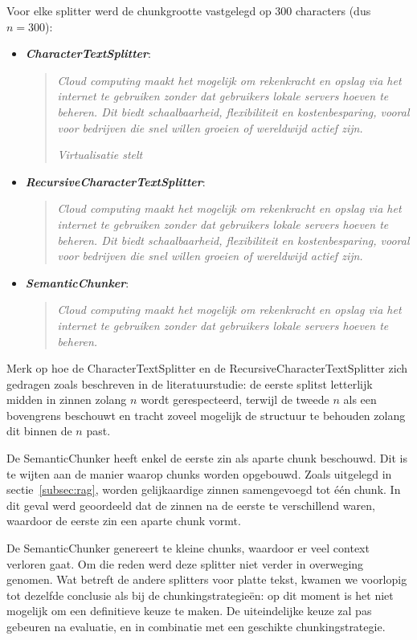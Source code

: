 Voor elke splitter werd de chunkgrootte vastgelegd op 300 characters (dus $n = 300$):

\begin{itemize}
    \item \textbf{\emph{CharacterTextSplitter}}: \begin{quote}
        \emph{Cloud computing maakt het mogelijk om rekenkracht en opslag via het internet te gebruiken zonder dat gebruikers lokale servers hoeven te beheren. Dit biedt schaalbaarheid, flexibiliteit en kostenbesparing, vooral voor bedrijven die snel willen groeien of wereldwijd actief zijn.}
        
        \emph{Virtualisatie stelt}
    \end{quote}
    \item \textbf{\emph{RecursiveCharacterTextSplitter}}: \begin{quote}
        \emph{Cloud computing maakt het mogelijk om rekenkracht en opslag via het internet te gebruiken zonder dat gebruikers lokale servers hoeven te beheren. Dit biedt schaalbaarheid, flexibiliteit en kostenbesparing, vooral voor bedrijven die snel willen groeien of wereldwijd actief zijn.}
    \end{quote}
    \item \textbf{\emph{SemanticChunker}}:  \begin{quote}
        \emph{Cloud computing maakt het mogelijk om rekenkracht en opslag via het internet te gebruiken zonder dat gebruikers lokale servers hoeven te beheren.}
    \end{quote}
\end{itemize}

Merk op hoe de CharacterTextSplitter en de RecursiveCharacterTextSplitter zich gedragen zoals beschreven in de literatuurstudie: de eerste splitst letterlijk midden in zinnen zolang $n$ wordt gerespecteerd, terwijl de tweede $n$ als een bovengrens beschouwt en tracht zoveel mogelijk de structuur te behouden zolang dit binnen de $n$ past.

De SemanticChunker heeft enkel de eerste zin als aparte chunk beschouwd. Dit is te wijten aan de manier waarop chunks worden opgebouwd. Zoals uitgelegd in sectie~\ref{subsec:rag}, worden gelijkaardige zinnen samengevoegd tot één chunk. In dit geval werd geoordeeld dat de zinnen na de eerste te verschillend waren, waardoor de eerste zin een aparte chunk vormt.

De SemanticChunker genereert te kleine chunks, waardoor er veel context verloren gaat. Om die reden werd deze splitter niet verder in overweging genomen. Wat betreft de andere splitters voor platte tekst, kwamen we voorlopig tot dezelfde conclusie als bij de chunkingstrategieën: op dit moment is het niet mogelijk om een definitieve keuze te maken. De uiteindelijke keuze zal pas gebeuren na evaluatie, en in combinatie met een geschikte chunkingstrategie.

